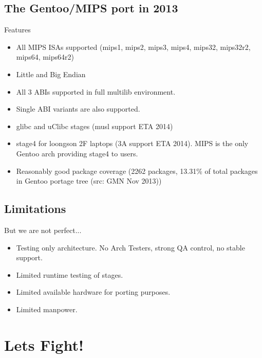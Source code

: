 \documentclass{beamer}
\begin{document}
\subsection{The Gentoo/MIPS port in 2013}

\begin{frame}{Features}
	\begin{itemize}
		\item All MIPS ISAs supported (mips1, mips2, mips3, mips4, mips32, mips32r2, mips64, mips64r2)
		\item Little and Big Endian
		\item All 3 ABIs supported in full multilib environment.
		\item Single ABI variants are also supported.
		\item glibc and uClibc stages (musl support ETA 2014)
		\item stage4 for loongson 2F laptops (3A support ETA 2014). MIPS is the only Gentoo arch providing stage4 to users.
		\item Reasonably good package coverage (2262 packages, 13.31\% of total packages in Gentoo portage tree (src: GMN Nov 2013))
	\end{itemize}
\end{frame}

\subsection{Limitations}

\begin{frame}{But we are not perfect...}
	\begin{itemize}
		\item Testing only architecture. No Arch Testers, strong QA control, no stable support.
		\item Limited runtime testing of stages.
		\item Limited available hardware for porting purposes.
		\item Limited manpower.
	\end{itemize}
\end{frame}


\section{Lets Fight{!}}
\end{document}
